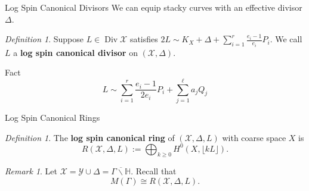 \documentclass{beamer}
\theoremstyle{remark}
\newtheorem{rem}[thm]{Remark}
\newtheorem{defn}[thm]{Definition}
\newcommand\BH{{\mathbb H}}
\newcommand\BQ{{\mathbb Q}}
\newcommand \sx{{\mathscr X}}
\newcommand \sy{{\mathscr Y}}
\DeclareMathOperator\di{Div}
\newcommand{\halfcan}{L}
\begin{document}
\begin{frame}{Log Spin Canonical Divisors}
We can equip stacky curves with an effective divisor $\Delta$.





\begin{defn}
Suppose $\halfcan \in \di
\sx$ satisfies $2 \halfcan \sim K_X + \Delta + \sum_{i = 1}^{r}
\frac{e_i - 1}{e_i} P_i$.  We call $\halfcan$ a
\textbf{log spin canonical divisor} on $(\sx, \Delta)$.
\end{defn}

\begin{block}{Fact}
\[
	\halfcan \sim \sum_{i = 1}^{r} \frac{e_i - 1}{2e_i} P_i
	+ \sum_{j = 1}^{\ell} a_j Q_j
\]
\end{block}

\end{frame}


\begin{frame}{Log Spin Canonical Rings}




\begin{defn}
The {\bf log spin canonical ring} of $(\sx, \Delta, \halfcan)$ with
coarse space $X$ is
\[
	R(\sx, \Delta, \halfcan) := \bigoplus_{k \geq 0} H^0(X, \lfloor k
	\halfcan \rfloor).
\]
\end{defn}

\begin{rem}
Let $\sx = \sy \cup \Delta = \overline{\Gamma \backslash \BH}$.
Recall that
\[
	M(\Gamma) \cong R(\sx, \Delta, \halfcan).
\]
\end{rem}

\end{frame}
\end{document}
